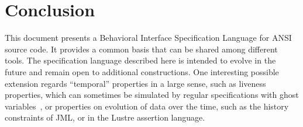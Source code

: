 
\chapter{Conclusion}

This document presents a Behavioral Interface Specification Language
for ANSI \lang source code. It provides a common basis that can be
shared among different tools.
The specification language described here is intended to evolve in the
future and remain open to additional constructions.
One interesting possible extension regards ``temporal''
properties in a large sense, such as liveness properties, which can
sometimes be simulated by regular specifications with ghost
variables~\cite{giorgetti06fase}, or properties on evolution of data
over the time, such as the history constraints of JML, or in the Lustre
assertion language.

